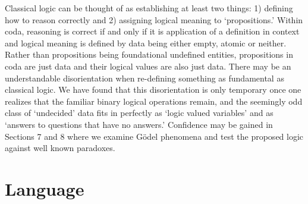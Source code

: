 \documentclass[11pt]{article}
\begin{document}
Classical logic can be thought of as establishing at least two things: 1) defining how to reason correctly and 2) assigning logical meaning to `propositions.'
Within coda, reasoning is correct if and only if it is application of a definition in context and logical meaning is defined by data being either empty, atomic or neither.
Rather than propositions being foundational undefined entities, propositions in coda are just data and their logical values are also just data.
There may be an understandable disorientation when re-defining something
as fundamental as classical logic.  We have found that this disorientation is only temporary once one realizes that the familiar binary logical operations remain,
 and the seemingly odd class of `undecided' data fits in perfectly as `logic valued variables' and as `answers to questions that have no answers.'  Confidence may
 be gained in Sections 7 and 8 where we examine G\"{o}del phenomena and test the proposed logic against well known paradoxes.

\section{Language}
\end{document}
